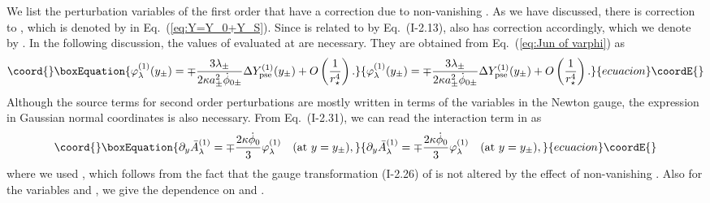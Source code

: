 \documentclass[a4paper,showpacs,preprintnumbers,amsmath,amssymb]{revtex4}
\begin{document}
We list the perturbation variables of the first order that have a correction due to non-vanishing \myHighlight{$\lambda_\pm$}\coordHE{}. 
As we have discussed, there is correction to \coordHE{}, which is denoted by \coordHE{} in Eq.~(\ref{eq:Y=Y_0+Y_S}). 
Since \coordHE{} is related to \coordHE{} by Eq.~(I-2.13), 
\coordHE{} also has correction accordingly, which we denote by \coordHE{}.
In the following discussion, the values of \coordHE{} evaluated at \coordHE{} are necessary. They are obtained from Eq.~(\ref{eq:Jun of varphi}) as 
\begin{equation}\coord{}\boxEquation{
\varphi_{ \lambda }^{(1)}(y_\pm)
     = \mp\frac{3\lambda_\pm}{2\kappa a_\pm^2\dot\phi_{0\pm}}
         \Delta  Y^{(1)}_{ \mathrm{pse} }(y_\pm)
     + O\left( \frac{1}{r^4_\star} \right) . 
\label{eq:varphi_lambda}
}{
\varphi_{ \lambda }^{(1)}(y_\pm)
     = \mp\frac{3\lambda_\pm}{2\kappa a_\pm^2\dot\phi_{0\pm}}
         \Delta  Y^{(1)}_{ \mathrm{pse} }(y_\pm)
     + O\left( \frac{1}{r^4_\star} \right) . 
}{ecuacion}\coordE{}\end{equation}
Although the source terms for second order perturbations are mostly written in terms of the variables in the Newton gauge, the expression \coordHE{}  in Gaussian normal coordinates is also necessary. 
From Eq.~(I-2.31), we can read the interaction term in 
\coordHE{} as
\begin{equation}\coord{}\boxEquation{
\partial_y\bar A^{(1)}_{ \lambda }=\mp \frac{2\kappa \dot{\phi}_0}{3}
         \varphi_{ \lambda }^{(1)}
 \quad   ({\mathrm{at~}} y=y_\pm) , 
}{
\partial_y\bar A^{(1)}_{ \lambda }=\mp \frac{2\kappa \dot{\phi}_0}{3}
         \varphi_{ \lambda }^{(1)}
 \quad   ({\mathrm{at~}} y=y_\pm) , 
}{ecuacion}\coordE{}\end{equation}
where we used 
\coordHE{}, which follows from the fact that the gauge transformation  (I-2.26) of \coordHE{} is not altered by the effect of non-vanishing \myHighlight{$\lambda_\pm$}\coordHE{}. 
Also for the variables \coordHE{} and
\coordHE{}, we give the dependence on \coordHE{} and \coordHE{}.  
\end{document}
